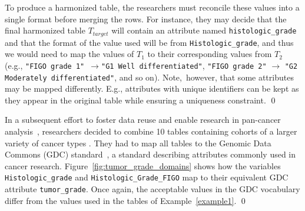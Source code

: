 \begin{example}
 To produce a harmonized table, the researchers must reconcile these values into a single format before merging the rows.
 For instance, they may decide that the final harmonized table $T_{target}$ will contain an attribute named \texttt{histologic\_grade} and that the format of the value used will be from \texttt{Histologic\_grade}, and thus we would need to map the values of $T_1$ to their corresponding values from $T_2$
 (e.g., 
 \mbox{\texttt{"FIGO grade 1"} $\rightarrow$\texttt{"G1 Well differentiated"}},
 \texttt{"FIGO grade 2"} $\rightarrow$ \texttt{"G2 Moderately differentiated"}, and so on).
 Note,~however, 
 that some attributes may be mapped differently.
 E.g., attributes with unique identifiers can be kept as they appear in the original table while ensuring a uniqueness constraint.
 \qed
\end{example}



\begin{example} \label{example2}
In a subsequent effort to foster data reuse and enable research in pan-cancer analysis~\cite{li2023proteogenomic}, researchers decided to combine 10 tables containing cohorts of a larger variety of cancer types \cite{cao2021proteogenomic, clark2019integrated, dou2020proteogenomic, gillette2020proteogenomic, mcdermott2020proteogenomic, huang2021proteogenomic, krug2020proteogenomic, satpathy2021proteogenomic, vasaikar2019proteogenomic, wang2021proteogenomic}.
They had to map all tables to the Genomic Data Commons (GDC) standard~\cite{gdc}, a standard describing attributes commonly used in cancer research.
Figure~\ref{fig:tumor_grade_domains} shows how the variables \texttt{Histologic\_grade} and \texttt{Histologic\_Grade\_FIGO} map to their equivalent GDC attribute \texttt{tumor\_grade}.
Once again, the acceptable values in the GDC vocabulary differ from the values used in the tables of Example~\ref{example1}.
\qed
\end{example}



